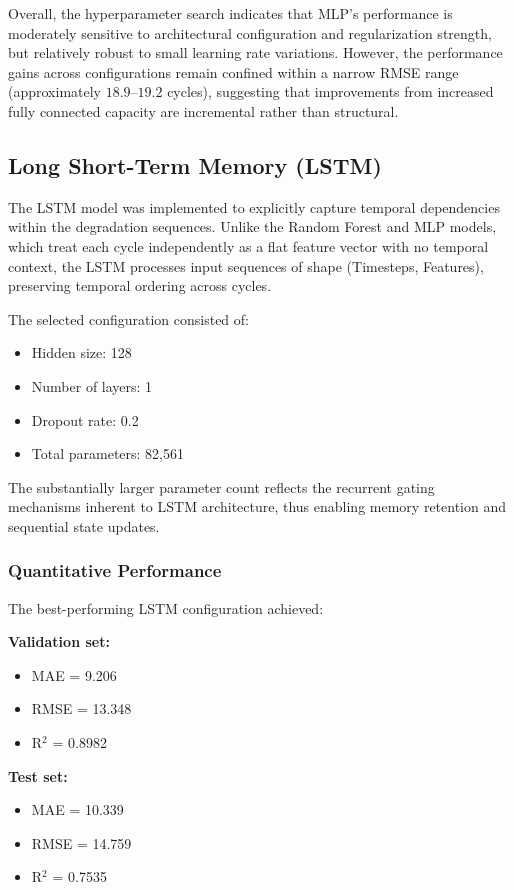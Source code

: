 \documentclass[conference]{IEEEtran}
\begin{document}
Overall, the hyperparameter search indicates that MLP's performance is moderately sensitive to architectural configuration and regularization strength, but relatively robust to small learning rate variations. However, the performance gains across configurations remain confined within a narrow RMSE range (approximately $18.9$--$19.2$ cycles), suggesting that improvements from increased fully connected capacity are incremental rather than structural.

\subsection{Long Short-Term Memory (LSTM)}

The LSTM model was implemented to explicitly capture temporal dependencies within the degradation sequences. Unlike the Random Forest and MLP models, which treat each cycle independently as a flat feature vector with no temporal context, the LSTM processes input sequences of shape (Timesteps, Features), preserving temporal ordering across cycles.

The selected configuration consisted of:
\begin{itemize}
    \item Hidden size: 128
    \item Number of layers: 1
    \item Dropout rate: 0.2
    \item Total parameters: 82,561
\end{itemize}

The substantially larger parameter count reflects the recurrent gating mechanisms inherent to LSTM architecture, thus enabling memory retention and sequential state updates.

\subsubsection{Quantitative Performance}
The best-performing LSTM configuration achieved:

\textbf{Validation set:}
\begin{itemize}
    \item MAE = 9.206
    \item RMSE = 13.348
    \item R$^2$ = 0.8982
\end{itemize}

\textbf{Test set:}
\begin{itemize}
    \item MAE = 10.339
    \item RMSE = 14.759
    \item R$^2$ = 0.7535
\end{itemize}
\end{document}
